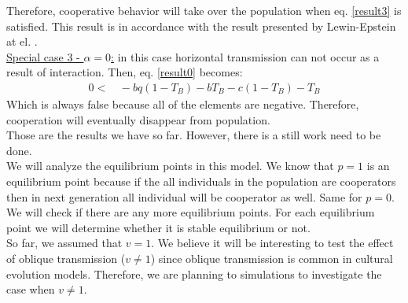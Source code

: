 \documentclass{article}
\begin{document}
Therefore, cooperative behavior will take over the population when eq. \eqref{result3} is satisfied. 
This result is in accordance with the result presented by Lewin-Epstein at el. \cite{Ohad}. 
\\\underline{Special case 3 - $\alpha = 0$:} in this case horizontal transmission can not occur as a result of interaction.  
Then, eq. \eqref{result0} becomes:
\begin{equation} 
\begin{split} \label{result4}
0 < & \,  - bq(1-T_B)- bT_B-c(1-T_B)-T_B
\end {split}
\end{equation}
Which is always false because all of the elements are negative. Therefore, cooperation will eventually disappear from population.
\\Those are the results we have so far. However, there is a still work need to be done. \\
We will analyze the equilibrium points in this model. We know that $p=1$ is an equilibrium point because if the all individuals in the population are cooperators then in next generation all individual will be cooperator as well. Same for $p=0$. We will check if there are any more equilibrium points. For each equilibrium point we will determine whether it is stable equilibrium or not. 
\\So far, we assumed that $v=1$. We believe it will be interesting to test the effect of oblique transmission ($v\neq 1$) since oblique transmission is common in cultural evolution models. Therefore, we are planning to simulations to investigate the case when $v\neq 1$. 
\end{document}
